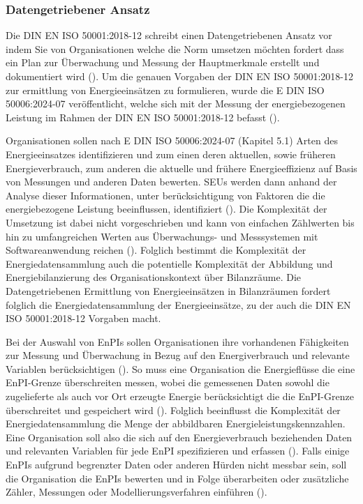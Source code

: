 \subsubsection{Datengetriebener Ansatz}

Die DIN EN ISO 50001:2018-12 schreibt einen Datengetriebenen Ansatz vor indem Sie von Organisationen welche die Norm umsetzen möchten fordert dass ein Plan zur 
Überwachung und Messung der Hauptmerkmale erstellt und dokumentiert wird (\cite[S. 30ff.]{DIN50001.2018}).
Um die genauen Vorgaben der DIN EN ISO 50001:2018-12 zur ermittlung von Energieeinsätzen zu formulieren, wurde die E DIN ISO 50006:2024-07 veröffentlicht,
welche sich mit der Messung der energiebezogenen Leistung im Rahmen der DIN EN ISO 50001:2018-12 befasst (\cite[S. 1]{DIN50006.2024}).

Organisationen sollen nach E DIN ISO 50006:2024-07 (Kapitel 5.1) Arten des Energieeinsatzes identifizieren und zum einen deren aktuellen, sowie früheren 
Energieverbrauch, zum anderen die aktuelle und frühere Energieeffizienz auf Basis von Messungen und anderen Daten bewerten. 
SEUs werden dann anhand der Analyse dieser Informationen, unter berücksichtigung von Faktoren die die energiebezogene Leistung beeinflussen, 
identifiziert (\cite[Kapitel 5.1]{DIN50006.2024}). 
Die Komplexität der Umsetzung ist dabei nicht vorgeschrieben und kann von einfachen Zählwerten bis hin zu umfangreichen Werten aus Überwachungs- und Messsystemen mit
Softwareanwendung reichen (\cite[S. 36]{DIN50001.2018}).
Folglich bestimmt die Komplexität der Energiedatensammlung auch die potentielle Komplexität der Abbildung und Energiebilanzierung 
des Organisationskontext über Bilanzräume. 
Die Datengetriebenen Ermittlung von Energieeinsätzen in Bilanzräumen fordert folglich die Energiedatensammlung der Energieeinsätze, 
zu der auch die DIN EN ISO 50001:2018-12 Vorgaben macht.

Bei der Auswahl von EnPIs sollen Organisationen ihre vorhandenen Fähigkeiten zur Messung und Überwachung in Bezug auf den 
Energiverbrauch und relevante Variablen berücksichtigen (\cite[S. 21]{DIN50006.2024}).
So muss eine Organisation die Energieflüsse die eine EnPI-Grenze überschreiten messen, wobei die gemessenen Daten sowohl die 
zugelieferte als auch vor Ort erzeugte Energie berücksichtigt die die EnPI-Grenze überschreitet und gespeichert wird (\cite[S. 17]{DIN50006.2024}).
Folglich beeinflusst die Komplexität der Energiedatensammlung die Menge der abbildbaren Energieleistungskennzahlen. 
Eine Organisation soll also die sich auf den Energieverbrauch beziehenden Daten und relevanten Variablen für jede EnPI spezifizieren und erfassen (\cite[S. 18]{DIN50006.2024}).
Falls einige EnPIs aufgrund begrenzter Daten oder anderen Hürden nicht messbar sein, soll die Organisation die EnPIs bewerten und in Folge überarbeiten oder 
zusätzliche Zähler, Messungen oder Modellierungsverfahren einführen (\cite[S. 18]{DIN50006.2024}).

